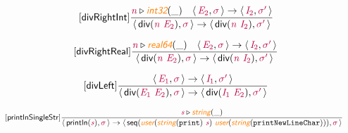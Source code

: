 \documentclass[10pt,leqno,fleqn]{article}
\newcommand{\artVariable}[1]{\mbox{\color{purple}\em #1\/}}
\newcommand{\artConstructor}[1]{\mbox{\sf #1}}
\newcommand{\artCaseInsensitiveLiteral}[1]{\mbox{\tt #1}}
\newcommand{\artSpecial}[1]{\mbox{\color{orange}\sf\em #1}}
\begin{document}
\begin{equation}
\tag*{[\artConstructor{\sf divRightInt}]}
\begin{split}\frac{ \artVariable{n}\triangleright \artSpecial{int32}(\_) \quad \langle\, \artVariable{E$_{2}$}, \artVariable{$\sigma$}\,\rangle \rightarrow \langle\, \artVariable{I$_{2}$}, \artVariable{$\sigma$\/$^\prime$}\,\rangle }{\langle\, \artConstructor{\sf div}(\artVariable{n}\ \artVariable{E$_{2}$}), \artVariable{$\sigma$}\,\rangle \rightarrow \langle\, \artConstructor{\sf div}(\artVariable{n}\ \artVariable{I$_{2}$}), \artVariable{$\sigma$\/$^\prime$}\,\rangle }
\end{split}
\end{equation}

\begin{equation}
\tag*{[\artConstructor{\sf divRightReal}]}
\begin{split}\frac{ \artVariable{n}\triangleright \artSpecial{real64}(\_) \quad \langle\, \artVariable{E$_{2}$}, \artVariable{$\sigma$}\,\rangle \rightarrow \langle\, \artVariable{I$_{2}$}, \artVariable{$\sigma$\/$^\prime$}\,\rangle }{\langle\, \artConstructor{\sf div}(\artVariable{n}\ \artVariable{E$_{2}$}), \artVariable{$\sigma$}\,\rangle \rightarrow \langle\, \artConstructor{\sf div}(\artVariable{n}\ \artVariable{I$_{2}$}), \artVariable{$\sigma$\/$^\prime$}\,\rangle }
\end{split}
\end{equation}

\begin{equation}
\tag*{[\artConstructor{\sf divLeft}]}
\begin{split}\frac{\langle\, \artVariable{E$_{1}$}, \artVariable{$\sigma$}\,\rangle \rightarrow \langle\, \artVariable{I$_{1}$}, \artVariable{$\sigma$\/$^\prime$}\,\rangle }{\langle\, \artConstructor{\sf div}(\artVariable{E$_{1}$}\ \artVariable{E$_{2}$}), \artVariable{$\sigma$}\,\rangle \rightarrow \langle\, \artConstructor{\sf div}(\artVariable{I$_{1}$}\ \artVariable{E$_{2}$}), \artVariable{$\sigma$\/$^\prime$}\,\rangle }
\end{split}
\end{equation}

\begin{equation}
\tag*{[\artConstructor{\sf printlnSingleStr}]}
\begin{split}\frac{ \artVariable{s}\triangleright \artSpecial{string}(\_) }{\langle\, \artConstructor{\sf println}(\artVariable{s}), \artVariable{$\sigma$}\,\rangle \rightarrow \langle\, \artConstructor{\sf seq}(\artSpecial{user}(\artSpecial{string}(\artCaseInsensitiveLiteral{print})\ \artVariable{s})\ \artSpecial{user}(\artSpecial{string}(\artCaseInsensitiveLiteral{printNewLineChar}))), \artVariable{$\sigma$}\,\rangle }
\end{split}
\end{equation}
\end{document}
